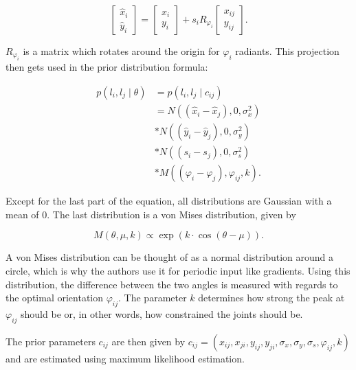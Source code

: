 \begin{equation}
    \begin{bmatrix}
        \hat{x}_i \\ 
        \hat{y}_i
    \end{bmatrix}
    =
    \begin{bmatrix}
        x_i \\ 
        y_i
    \end{bmatrix}
    + s_i R_{\varphi_i}
    \begin{bmatrix}
        x_{ij} \\ 
        y_{ij}
    \end{bmatrix}.
\end{equation}

$R_{\varphi_i}$ is a matrix which rotates around the origin for $\varphi_i$ radiants.
This projection then gets used in the prior distribution formula:

\begin{equation}
    \begin{split}
        p(l_i, l_j \mid \theta) 
        &= p(l_i, l_j \mid c_{ij}) \\
        &= N((\hat{x}_i - \hat{x}_j), 0, \sigma_x^2) \\
        &* N((\hat{y}_i - \hat{y}_j), 0, \sigma_y^2) \\
        &* N((s_i - s_j), 0, \sigma_s^2) \\
        &* M((\varphi_i - \varphi_j), \varphi_{ij}, k).
    \end{split}    
\end{equation}

Except for the last part of the equation, all distributions are Gaussian with a mean of $0$.
The last distribution is a von Mises distribution, given by

\begin{equation}
    M(\theta, \mu, k) \propto \exp (k \cdot \cos (\theta - \mu)).
\end{equation}

A von Mises distribution can be thought of as a normal distribution around a circle, which is why the authors use it for periodic input like gradients.
Using this distribution, the difference between the two angles is measured with regards to the optimal orientation $\varphi_{ij}$.
The parameter $k$ determines how strong the peak at $\varphi_{ij}$ should be or, in other words, how constrained the joints should be. 

The prior parameters $c_{ij}$ are then given by $c_{ij} = (x_{ij}, x_{ji}, y_{ij}, y_{ji}, \sigma_x, \sigma_y, \sigma_s, \varphi_{ij}, k)$ and are estimated using maximum likelihood estimation.

